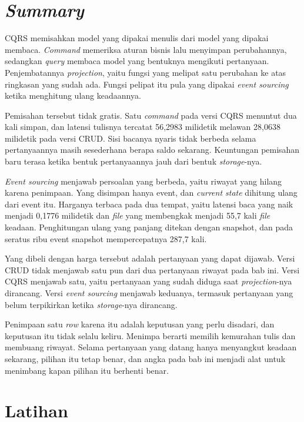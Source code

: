 \section{\textit{Summary}}

CQRS memisahkan model yang dipakai menulis dari model yang dipakai membaca.
\textit{Command} memeriksa aturan bisnis lalu menyimpan perubahannya, sedangkan \textit{query}
membaca model yang bentuknya mengikuti pertanyaan. Penjembatannya \textit{projection},
yaitu fungsi yang melipat satu perubahan ke atas ringkasan yang sudah ada.
Fungsi pelipat itu pula yang dipakai \textit{event sourcing} ketika menghitung
ulang keadaannya.

Pemisahan tersebut tidak gratis. Satu \textit{command} pada versi CQRS menuntut dua
kali simpan, dan latensi tulisnya tercatat 56,2983 milidetik melawan 28,0638
milidetik pada versi CRUD. Sisi bacanya nyaris tidak berbeda selama
pertanyaannya masih sesederhana berapa saldo sekarang. Keuntungan pemisahan
baru terasa ketika bentuk pertanyaannya jauh dari bentuk \textit{storage}-nya.

\textit{Event sourcing} menjawab persoalan yang berbeda, yaitu riwayat yang
hilang karena penimpaan. Yang disimpan hanya event, dan \textit{current state}
dihitung ulang dari event itu. Harganya terbaca pada dua tempat, yaitu
latensi baca yang naik menjadi 0,1776 milidetik dan \textit{file} yang membengkak
menjadi 55,7 kali \textit{file} keadaan. Penghitungan ulang yang panjang ditekan
dengan snapshot, dan pada seratus ribu event snapshot mempercepatnya 287,7
kali.

Yang dibeli dengan harga tersebut adalah pertanyaan yang dapat dijawab. Versi
CRUD tidak menjawab satu pun dari dua pertanyaan riwayat pada bab ini. Versi
CQRS menjawab satu, yaitu pertanyaan yang sudah diduga saat \textit{projection}-nya
dirancang. Versi \textit{event sourcing} menjawab keduanya, termasuk pertanyaan
yang belum terpikirkan ketika \textit{storage}-nya dirancang.

Penimpaan satu \textit{row} karena itu adalah keputusan yang perlu disadari, dan
keputusan itu tidak selalu keliru. Menimpa berarti memilih kemurahan tulis dan
membuang riwayat. Selama pertanyaan yang datang hanya menyangkut keadaan
sekarang, pilihan itu tetap benar, dan angka pada bab ini menjadi alat untuk
menimbang kapan pilihan itu berhenti benar.

\section{Latihan}


